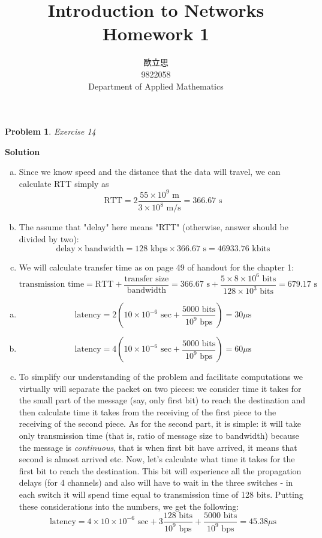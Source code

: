 \documentclass[11pt]{article} %
\title{Introduction to Networks\\Homework 1}
\author{歐立思\\
9822058\\Department of Applied Mathematics}
\newtheorem{prob}{Problem}
\newenvironment{solution}%
{\par\textbf{Solution}\space }%
{\par}
\begin{document}
\begin{CJK}{UTF8}{bsmi}
\maketitle
\end{CJK}
\begin{prob}
	Exercise 14
\end{prob}
\begin{solution}
\begin{enumerate}[(a)]
	\item{Since we know speed and the distance that the data will travel, we can calculate RTT simply as \[\text{RTT}=
		2\frac{55\times10^9 \text{ m}}{3 \times 10^8 \text{ m/s}}=366.67 \text{ s}\]}
	\item{The assume that "delay" here means "RTT" (otherwise, answer should be divided by two):\[\text{delay}\times\text{bandwidth}=
		128\text{ kbps} \times 366.67\text{ s}=46933.76\text{ kbits}\]
		}
	\item{We will calculate transfer time as on page 49 of handout for the chapter 1:\[\text{transmission time}=\text{RTT}+
		\frac{\text{transfer size}}{\text{bandwidth}}=366.67\text{ s}+\frac{5\times8\times10^6\text{ bits}}{128 \times 10^3\text{ bits}}=
		679.17\text{ s}\]
		}
\end{enumerate}
\end{solution}
\begin{enumerate}[(a)]
	\item{\[\text{latency}=2(10\times10^{-6}\text{ sec}+\frac{5000\text{ bits}}{10^{9}\text{ bps}})=30 \mu\text{s}\]
		}
	\item{\[\text{latency}=4(10\times10^{-6}\text{ sec}+\frac{5000\text{ bits}}{10^{9}\text{ bps}})=60 \mu\text{s}\]
		}
	\item{To simplify our understanding of the problem and facilitate computations we virtually will separate the packet on two pieces: 
		we consider time it takes for the small part of the message (say, only first bit) to reach the destination and then calculate
		time it takes from the receiving of the first piece to the receiving of the second piece. As for the second part, it is simple:
		it will take only transmission time (that is, ratio of message size to bandwidth) because the message is \textit{continuous}, that
		is when first bit have arrived, it means that second is almost arrived etc. Now, let's calculate what time it takes for the
		first bit to reach the destination. This bit will experience all the propagation delays (for 4 channels) and also will
		have to wait in the three switches - in each switch it will spend time equal to transmission time of 128 bits. Putting these
		considerations into the numbers, we get the following: \[\text{latency}=
		4\times10\times10^{-6}\text{ sec}+3\frac{128\text{ bits}}{10^{9}\text{ bps}}+\frac{5000\text{ bits}}{10^{9}\text{ bps}}=45.38\mu
		\text{s}\]
		}
\end{enumerate}
\end{document}
